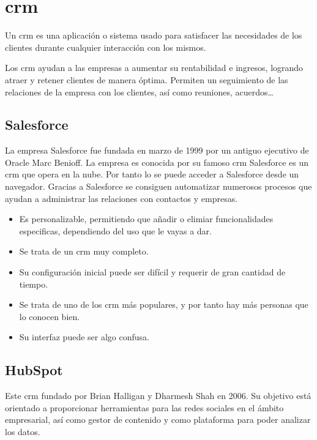 \section{\acrfull{crm}}

Un \acrshort{crm} es una aplicación o sistema usado para satisfacer las necesidades de los clientes durante cualquier interacción con los mismos.

Los \acrshort{crm} ayudan a las empresas a aumentar su rentabilidad e ingresos, logrando atraer y retener clientes de manera óptima. 
Permiten un seguimiento de las relaciones de la empresa con los clientes, así como reuniones, acuerdos\ldots


\subsection{Salesforce}
La empresa Salesforce fue fundada en marzo de 1999 por un antiguo ejecutivo de Oracle Marc Benioff. La empresa es conocida por su famoso \acrshort{crm}
Salesforce es un \acrshort{crm} que opera en la nube. Por tanto lo se puede acceder a Salesforce desde un navegador. Gracias a Salesforce se consiguen automatizar numerosos procesos que ayudan a administrar las relaciones con contactos y empresas.

\begin{itemize}
	\item Es personalizable, permitiendo que añadir o elimiar funcionalidades especificas, dependiendo del uso que le vayas a dar.
	\item Se trata de un \acrshort{crm} muy completo.
	\item Su configuración inicial puede ser difícil y requerir de gran cantidad de tiempo.
	\item Se trata de uno de los \acrshort{crm} más populares, y por tanto hay más personas que lo conocen bien.
	\item Su interfaz puede ser algo confusa.

\end{itemize}

\subsection{HubSpot}

Este \acrshort{crm} fundado por Brian Halligan y Dharmesh Shah en 2006. Su objetivo está orientado a proporcionar herramientas para las redes sociales en el ámbito empresarial, así como gestor de contenido y como plataforma para poder analizar los datos.

